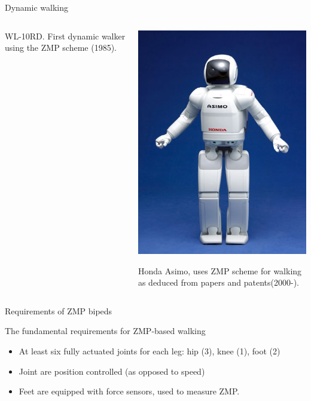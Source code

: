 \documentclass[compress]{beamer}
\begin{document}
\begin{frame}{Dynamic walking}
\begin{columns}
\begin{column}{0.5\linewidth}
\begin{center}
    WL-10RD. First dynamic walker using the ZMP scheme (1985).
            \end{center}
        \end{column}
        \begin{column}{0.5\linewidth}
            \begin{center}
                \includegraphics[width=0.8\linewidth]{image47}

    Honda Asimo, uses ZMP scheme for walking as deduced from papers and
    patents(2000-). 
            \end{center}
        \end{column}
    \end{columns}


\end{frame}

\begin{frame}{Requirements of ZMP bipeds}

    The fundamental requirements for ZMP-based walking

    \begin{itemize}

        \item At least six fully actuated joints for each leg: hip (3), knee (1),
            foot (2)
        \item Joint are position controlled (as opposed to speed)
        \item Feet are equipped with force sensors, used to measure ZMP.
    \end{itemize}

\end{frame}
\end{document}
